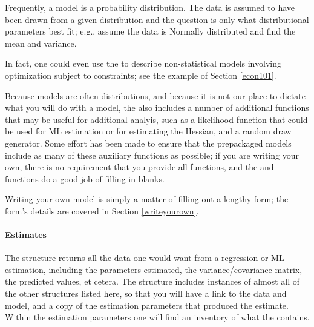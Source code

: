 

Frequently, a model is a probability distribution. The data is assumed
to have been drawn from a given distribution and the question is
only what distributional parameters best fit; e.g., assume the data
is Normally distributed and find the mean and variance.

In fact, one could even use the  to describe 
non-statistical models involving optimization subject to constraints;
see the example of Section \ref{econ101}.

Because models are often distributions, and because it is not our place
to dictate what you will do with a model, the  also includes a
number of additional functions that may be useful for additional analyis,
such as a likelihood function that could be used for ML estimation or
for estimating the Hessian, and a random draw generator. Some effort
has been made to ensure that the prepackaged models include as many of
these auxiliary functions as possible; if you are writing your own,
there is no requirement that you provide all functions, and the  and 
functions do a good job of filling in blanks.

Writing your own model is simply a matter of filling out a lengthy form;
the form's details are covered in Section \ref{writeyourown}.

\paragraph{Estimates} 
The  structure returns all the data one would want
from a regression or ML estimation, including the parameters estimated,
the variance/covariance matrix, the predicted values, et cetera. The structure
includes instances of almost all of the other structures listed here, so
that you will have a link to the data and model, and a copy of the
estimation parameters that produced the estimate. Within the
estimation parameters one will find an inventory of
what the  contains.

